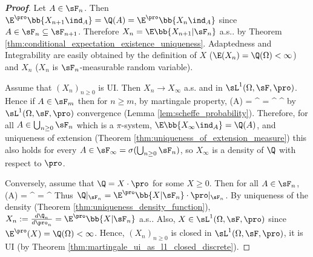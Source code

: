\begin{proof}[\bf Proof]%

Let $A \in \sF_n$. Then $\E^{\pro}\bb{X_{n+1}\ind_A} = \Q(A) = \E^{\pro}\bb{X_n\ind_A}$ since $A \in \sF_n\subseteq \sF_{n+1}$. Therefore $X_n = \E\bb{X_{n+1}|\sF_n}$ a.s.. by Theorem \ref{thm:conditional_expectation_existence_uniqueness}. Adaptedness and Integrability are easily obtained by the definition of $X$ ($\E(X_n) = \Q(\Omega) < \infty $) and $X_n$ ($X_n$ is $\sF_n$-measurable random variable).



Assume that $(X_n)_{n \geq 0}$ is UI. Then $X_n \to  X_\infty$ a.s. and in $\sL^1(\Omega,\sF,\pro)$. Hence if $A \in \sF_m$ then for $n \geq m$, by martingale property,
\be
\Q(A) = \E^\pro{} = \E^\pro{} \to \E^\pro{}
\ee
by $\sL^1(\Omega,\sF,\pro)$ convergence (Lemma \ref{lem:scheffe_probability}). Therefore, for all $A \in \bigcup_{n\geq0} \sF_n$ which is a $\pi$-system, $\E\bb{X_\infty \ind_A} = \Q(A)$, and uniqueness of extension (Theorem \ref{thm:uniqueness_of_extension_measure}) this also holds for every $A \in \sF_\infty = \sigma(\bigcup_{n\geq0} \sF_n)$, so $X_\infty$ is a density of $\Q$ with respect to $\pro$.

Conversely, assume that $\Q = X \cdot \pro$ for some $X \geq 0$. Then for all $A \in \sF_n$,
\be
\Q(A) = \E^\pro{} = \E^\pro{}
\ee
Thus $\Q|_{\sF_n} = \E^\pro\bb{X | \sF_n} \cdot \pro|_{\sF_n}$. By uniqueness of the density (Theorem \ref{thm:uniqueness_density_function}), $X_n := \frac{d\Q_n}{d\pro_n} = \E^\pro\bb{X |\sF_n}$ a.s.. Also, $X\in \sL^1(\Omega,\sF,\pro)$ since $\E^\pro(X) = \Q(\Omega) < \infty$. Hence, $(X_n)_{n \geq 0}$ is closed in $\sL^1(\Omega,\sF,\pro)$, it is UI (by Theorem \ref{thm:martingale_ui_as_l1_closed_discrete}).
\end{proof}



